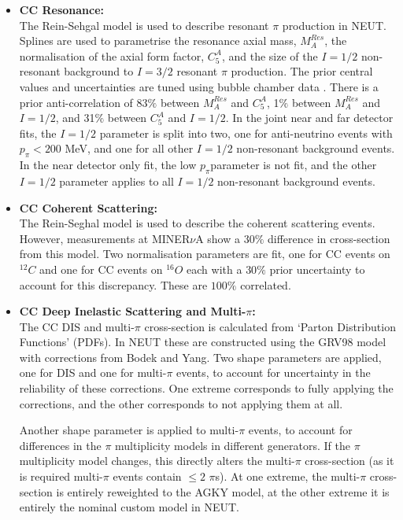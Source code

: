 \begin{itemize}
\item \textbf{CC Resonance:}\\
The Rein-Sehgal model\cite{reinessehgal} is used to describe resonant $\pi$ production in NEUT. Splines are used to parametrise the resonance axial mass, $M^{Res}_{A}$, the normalisation of the axial form factor, $C^{A}_{5}$, and the size of the $I=1/2$ non-resonant background to $I=3/2$ resonant $\pi$ production. The prior central values and uncertainties are tuned using bubble chamber data \cite{bubblechamber}. There is a prior anti-correlation of 83$\%$ between $M^{Res}_{A}$ and $C^{A}_{5}$, 1$\%$ between $M^{Res}_{A}$ and $I=1/2$, and 31$\%$ between $C^{A}_{5}$ and $I=1/2$. In the joint near and far detector fits, the $I=1/2$ parameter is split into two, one for anti-neutrino events with $p_{\pi} < 200$ MeV, and one for all other $I=1/2$ non-resonant background events. In the near detector only fit, the low $p_{\pi}$parameter is not fit, and the other $I=1/2$ parameter applies to all $I=1/2$ non-resonant background events.

\item \textbf{CC Coherent Scattering:}\\
The Rein-Seghal model \cite{reincoh} is used to describe the coherent scattering events.
However, measurements at MINER$\nu$A show a $30\%$ difference in cross-section from this model. Two normalisation parameters are fit, one for CC events on $^{12}C$ and one for CC events on $^{16}O$ each with a $30\%$ prior uncertainty to account for this discrepancy. These are $100\%$ correlated.

\item \textbf{CC Deep Inelastic Scattering and Multi-$\pi$:}\\
The CC DIS and multi-$\pi$ cross-section is calculated from `Parton Distribution Functions' (PDFs). In NEUT these are constructed using the GRV98\cite{grv98} model with corrections from Bodek and Yang\cite{by}. Two shape parameters are applied, one for DIS and one for multi-$\pi$ events, to account for uncertainty in the reliability of these corrections. One extreme corresponds to fully applying the corrections, and the other corresponds to not applying them at all.

Another shape parameter is applied to multi-$\pi$ events, to account for differences in the $\pi$ multiplicity models in different generators. If the $\pi$ multiplicity model changes, this directly alters the multi-$\pi$ cross-section (as it is required multi-$\pi$ events contain $\leq2$ $\pi$s). At one extreme, the multi-$\pi$ cross-section is entirely reweighted to the AGKY model\cite{agky}, at the other extreme it is entirely the nominal custom model in NEUT.


\end{itemize}
